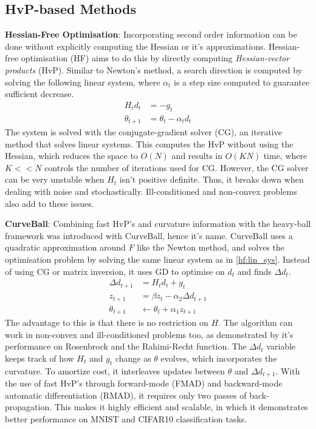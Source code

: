 \subsection{HvP-based Methods}
\textbf{Hessian-Free Optimisation}: Incorporating second order information can be done without explicitly computing the Hessian or it's approximations. Hessian-free optimisation (HF) aims to do this by directly computing \textit{Hessian-vector products} (HvP). Similar to Newton's method, a search direction is computed by solving the following linear system, where $\alpha_t$ is a step size computed to guarantee sufficient decrease.
\begin{align}
    H_t d_t &= - g_t \\ \label{hf:lin_sys}
    \theta_{t+1} &= \theta_t - \alpha_t d_t
\end{align}
The system is solved with the conjugate-gradient solver (CG), an iterative method that solves linear systems. This computes the HvP without using the Hessian, which reduces the space to $O(N)$ and results in $O(KN)$ time, where $K << N$ controls the number of iterations used for CG. However, the CG solver can be very unstable when $H_t$ isn't positive definite. Thus, it breaks down when dealing with noise and stochastically. Ill-conditioned and non-convex problems also add to these issues.

\textbf{CurveBall}: Combining fast HvP's and curvature information with the heavy-ball framework was introduced with CurveBall, hence it's name. CurveBall uses a quadratic approximation around $F$ like the Newton method, and solves the optimisation problem by solving the same linear system as in \cref{hf:lin_sys}. Instead of using CG or matrix inversion, it uses GD to optimise on $d_t$ and finds $\Delta d_t$. 
\begin{align}
\Delta d_{t+1} &= H_t d_t + g_t \\
z_{t+1} &= \beta z_{t} - \alpha_2 \Delta d_{t+1} \\
\theta_{t+1} &\leftarrow \theta_t + \alpha_1 z_{t+1}
\end{align}
The advantage to this is that there is no restriction on $H$. The algorithm can work in non-convex and ill-conditioned problems too, as demonstrated by it's performance on Rosenbrock and the Rahimi-Recht function. The $\Delta d_{t}$ variable keeps track of how $H_t$ and $g_t$ change as $\theta$ evolves, which incorporates the curvature. To amortize cost, it interleaves updates between $\theta$ and $\Delta d_{t+1}$. With the use of fast HvP's through forward-mode (FMAD) and backward-mode automatic differentiation (RMAD), it requires only two passes of back-propagation. This makes it highly efficient and scalable, in which it demonstrates better performance on MNIST and CIFAR10 classification tasks.  

